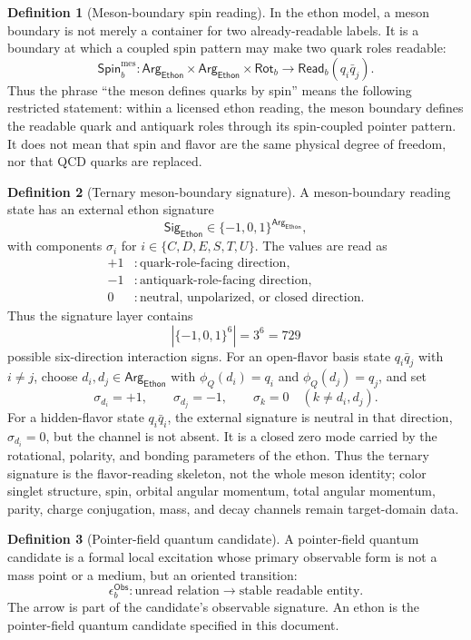 \documentclass[11pt]{article}
\theoremstyle{definition}
\newtheorem{definition}{Definition}[section]
\theoremstyle{plain}
\newcommand{\Eth}{\mathsf{Ethon}}
\newcommand{\Obs}{\mathsf{Obs}}
\newcommand{\Arg}{\mathsf{Arg}}
\newcommand{\Rot}{\mathsf{Rot}}
\newcommand{\Spin}{\mathsf{Spin}}
\newcommand{\Sig}{\mathsf{Sig}}
\newcommand{\Read}{\mathsf{Read}}
\begin{document}
\begin{definition}[Meson-boundary spin reading]
In the ethon model, a meson boundary is not merely a container for two
already-readable labels.  It is a boundary at which a coupled spin
pattern may make two quark roles readable:
\[
  \Spin_b^{\mathrm{mes}}:
  \Arg_{\Eth}\times\Arg_{\Eth}\times\Rot_b
  \longrightarrow
  \Read_b(q_i\bar q_j).
\]
Thus the phrase ``the meson defines quarks by spin'' means the following
restricted statement: within a licensed ethon reading, the meson boundary
defines the readable quark and antiquark roles through its spin-coupled
pointer pattern.  It does not mean that spin and flavor are the same
physical degree of freedom, nor that QCD quarks are replaced.
\end{definition}

\begin{definition}[Ternary meson-boundary signature]
A meson-boundary reading state has an external ethon signature
\[
  \Sig_{\Eth}\in\{-1,0,1\}^{\Arg_{\Eth}},
\]
with components \(\sigma_i\) for \(i\in\{C,D,E,S,T,U\}\).  The values
are read as
\[
  \begin{aligned}
  +1&:\text{quark-role-facing direction},\\
  -1&:\text{antiquark-role-facing direction},\\
   0&:\text{neutral, unpolarized, or closed direction}.
  \end{aligned}
\]
Thus the signature layer contains
\[
  |\{-1,0,1\}^{6}|=3^6=729
\]
possible six-direction interaction signs.  For an open-flavor basis
state \(q_i\bar q_j\) with \(i\neq j\), choose \(d_i,d_j\in\Arg_{\Eth}\)
with \(\phi_Q(d_i)=q_i\) and \(\phi_Q(d_j)=q_j\), and set
\[
  \sigma_{d_i}=+1,\qquad
  \sigma_{d_j}=-1,\qquad
  \sigma_k=0\quad(k\neq d_i,d_j).
\]
For a hidden-flavor state \(q_i\bar q_i\), the external signature is
neutral in that direction, \(\sigma_{d_i}=0\), but the channel is not
absent.  It is a closed zero mode carried by the rotational, polarity,
and bonding parameters of the ethon.  Thus the ternary signature is the
flavor-reading skeleton, not the whole meson identity; color singlet
structure, spin, orbital angular momentum, total angular momentum,
parity, charge conjugation, mass, and decay channels remain target-domain
data.
\end{definition}

\begin{definition}[Pointer-field quantum candidate]
A pointer-field quantum candidate is a formal local excitation whose
primary observable form is not a mass point or a medium, but an oriented
transition:
\[
  \epsilon^{\Obs}_b:
  \text{unread relation}
  \longrightarrow
  \text{stable readable entity}.
\]
The arrow is part of the candidate's observable signature.  An ethon is
the pointer-field quantum candidate specified in this document.
\end{definition}
\end{document}

